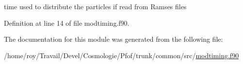 time used to distribute the particles if read from Ramses files 



Definition at line 14 of file modtiming.\-f90.



The documentation for this module was generated from the following file\-:\begin{DoxyCompactItemize}
\item 
/home/roy/\-Travail/\-Devel/\-Cosmologie/\-Pfof/trunk/common/src/\hyperlink{modtiming_8f90}{modtiming.\-f90}\end{DoxyCompactItemize}
